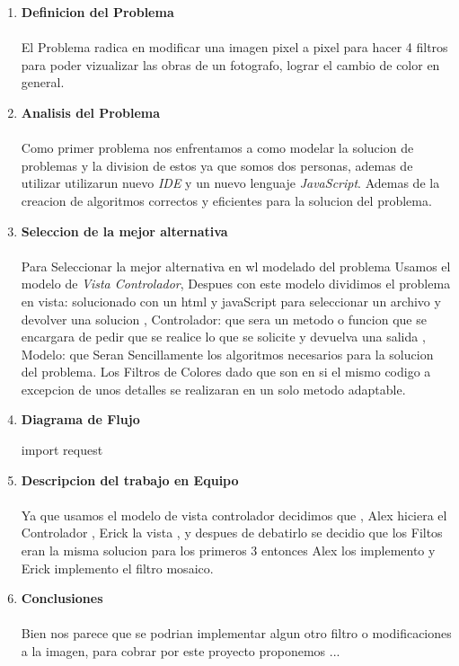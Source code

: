 \documentclass[10pt,letterpaper,fleqn]{article}
\begin{document}
    \begin{enumerate}
        
        \item {\Large \textbf{Definicion del Problema}}\\
        \\El Problema radica en  modificar una imagen pixel a pixel para hacer 4 filtros para poder vizualizar las obras de un fotografo, lograr el cambio de color en general.
    	
    	\vspace{2cm}
    	\item {\Large \textbf{Analisis del Problema}}\\
    	\\Como primer problema nos enfrentamos a como modelar la solucion de problemas y la division de estos ya que somos dos personas, ademas de utilizar utilizarun  nuevo \textit{IDE} y un nuevo lenguaje \textit{JavaScript}.
    	Ademas de la creacion de algoritmos correctos y eficientes para la solucion del problema.
    	
    	\vspace{2cm}
    	\item {\Large \textbf{Seleccion de la mejor alternativa}}\\
    	\\Para Seleccionar la mejor alternativa en wl modelado del problema Usamos el modelo de \textit{Vista Controlador}, Despues con este modelo dividimos el problema en vista: solucionado con un html y javaScript para seleccionar un archivo y devolver una solucion , Controlador: que sera un metodo o funcion que se encargara de pedir que se realice lo que se solicite y devuelva una salida , Modelo: que Seran Sencillamente los algoritmos necesarios para la solucion del problema.
    	Los Filtros de Colores dado que son en si el mismo codigo a excepcion de unos detalles se realizaran en un solo metodo adaptable.
    	
    	\vspace{2cm}
    	\item {\Large \textbf{Diagrama de Flujo}}\\
    	\begin{algorithmic}
    	    import request
    	    
    	\end{algorithmic}
    	
    	\vspace{2cm}
    	\item {\Large \textbf{Descripcion del trabajo en Equipo}}\\
    	\\Ya que usamos el modelo de vista controlador decidimos que , Alex hiciera el Controlador , Erick la vista , y despues de debatirlo  se decidio que los Filtos eran la misma solucion para los primeros 3 entonces Alex los implemento y Erick implemento el filtro mosaico.
    	
    	\vspace{2cm}
    	\item {\Large \textbf{Conclusiones}}\\
    	\\Bien nos parece que se podrian implementar algun otro filtro o modificaciones a la imagen, para cobrar por este proyecto proponemos ...
    	

	\end{enumerate}
        
\end{document}
